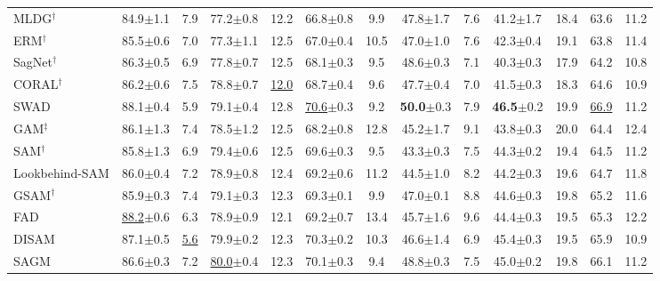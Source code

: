 \documentclass{article}
\theoremstyle{plain}
\theoremstyle{definition}
\theoremstyle{remark}
\begin{document}
\begin{table}[htbp]
{\begin{tabular}{lcccccccccc|cc}
MLDG\(^\dag\) \cite{li2018mldg}& 84.9\tiny$\pm$1.1 & 7.9 & 77.2\tiny$\pm$0.8 & 12.2 & 66.8\tiny$\pm$0.8 & 9.9 & 47.8\tiny$\pm$1.7 & 7.6 & 41.2\tiny$\pm$1.7 & 18.4 &  {63.6} &  {11.2} \\
ERM\(^\dag\) & 85.5\tiny$\pm$0.6 & 7.0 & 77.3\tiny$\pm$1.1 & 12.5 & 67.0\tiny$\pm$0.4 & 10.5 & 47.0\tiny$\pm$1.0 & 7.6 & 42.3\tiny$\pm$0.4 & 19.1 &  {63.8} &  {11.4} \\
SagNet\(^\dag\) \cite{nam2021sagnet}& 86.3\tiny$\pm$0.5 & 6.9 & 77.8\tiny$\pm$0.7 & 12.5 & 68.1\tiny$\pm$0.3 & 9.5 & 48.6\tiny$\pm$0.3 & 7.1 & 40.3\tiny$\pm$0.3 & 17.9 &  {64.2} &  {10.8} \\
CORAL\(^\dag\) \cite{sun2016coral}& 86.2\tiny$\pm$0.6 & 7.5 & 78.8\tiny$\pm$0.7 & \underline{12.0} & 68.7\tiny$\pm$0.4 & 9.6 & 47.7\tiny$\pm$0.4 & 7.0 & 41.5\tiny$\pm$0.3 & 18.3 &  {64.6} &  {10.9} \\
SWAD \cite{cha2021swad}& 88.1\tiny$\pm$0.4 & 5.9 & 79.1\tiny$\pm$0.4 & 12.8 & \underline{70.6}\tiny$\pm$0.3 & 9.2 & \textbf{50.0}\tiny$\pm$0.3 & 7.9 & \textbf{46.5}\tiny$\pm$0.2 & 19.9 &  {\underline{66.9}} &  {11.2} \\
\midrule
GAM\(^\ddag\) \cite{zhang2023gam}& 86.1\tiny$\pm$1.3 & 7.4 & 78.5\tiny$\pm$1.2 & 12.5 & 68.2\tiny$\pm$0.8 & 12.8 & 45.2\tiny$\pm$1.7 & 9.1 & 43.8\tiny$\pm$0.3 & 20.0 &  {64.4} &  {12.4} \\
SAM\(^\dag\) \cite{foret2021sam} & 85.8\tiny$\pm$1.3 & 6.9 & 79.4\tiny$\pm$0.6 & 12.5 & 69.6\tiny$\pm$0.3 & 9.5 & 43.3\tiny$\pm$0.3 & 7.5 & 44.3\tiny$\pm$0.2 & 19.4 &  {64.5} &  {11.2} \\
Lookbehind-SAM \cite{mordido2024lookbehind} & 86.0\tiny$\pm$0.4 & 7.2 & 78.9\tiny$\pm$0.8 & 12.4 & 69.2\tiny$\pm$0.6 & 11.2 & 44.5\tiny$\pm$1.0 & 8.2 & 44.2\tiny$\pm$0.3 & 19.6 &  {64.7} &  {11.8} \\
GSAM\(^\dag\) \cite{zhuang2022gsam} & 85.9\tiny$\pm$0.3 & 7.4 & 79.1\tiny$\pm$0.3 & 12.3 & 69.3\tiny$\pm$0.1 & 9.9 & 47.0\tiny$\pm$0.1 & 8.8 & 44.6\tiny$\pm$0.3 & 19.8 &  {65.2} &  {11.6} \\
FAD \cite{zhang2023fad} & \underline{88.2}\tiny$\pm$0.6 & 6.3 & 78.9\tiny$\pm$0.9 & 12.1 & 69.2\tiny$\pm$0.7 & 13.4 & 45.7\tiny$\pm$1.6 & 9.6 & 44.4\tiny$\pm$0.3 & 19.5 &  {65.3} &  {12.2} \\
DISAM \cite{zhang2024disam} & 87.1\tiny$\pm$0.5 & \underline{5.6} & 79.9\tiny$\pm$0.2 & 12.3 & 70.3\tiny$\pm$0.2 & 10.3 & 46.6\tiny$\pm$1.4 & 6.9 & 45.4\tiny$\pm$0.3 & 19.5 &  {65.9} &  {10.9} \\
SAGM \cite{wang2023sagm} & 86.6\tiny$\pm$0.3 & 7.2 & \underline{80.0}\tiny$\pm$0.4 & 12.3 & 70.1\tiny$\pm$0.3 & 9.4 & 48.8\tiny$\pm$0.3 & 7.5 & 45.0\tiny$\pm$0.2 & 19.8 &  {66.1} &  {11.2} \\

\end{tabular}}
\end{table}
\end{document}
